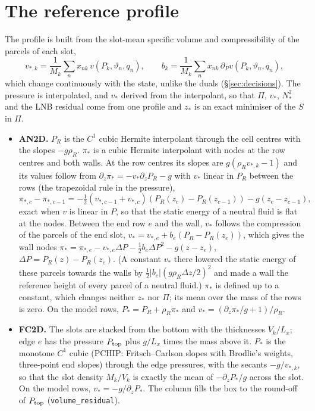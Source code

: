 \documentclass[11pt,a4paper]{article}
\newcommand{\vt}{\vartheta}
\newcommand{\code}[1]{\texttt{#1}}
\newcommand{\Ptop}{P_{\rm top}}
\newcommand{\zs}{z_{*}}
\begin{document}
\section{The reference profile}\label{sec:profile}
The profile is built from the slot-mean specific volume and compressibility of the parcels of each slot,
\begin{equation}
  v_{*,k}=\frac1{M_k}\sum_nx_{nk}\,v(P_k,\vt_n,q_n),\qquad b_k=\frac1{M_k}\sum_nx_{nk}\,\partial_Pv(P_k,\vt_n,q_n),
\end{equation}
which change continuously with the state, unlike the duals (\S\ref{sec:decisions}). The pressure is interpolated, and $v_*$
derived from the interpolant, so that $\Pi$, $v_*$, $N_*^2$ and the LNB residual come from one profile and $\zs$ is an exact
minimiser of the $S$ in $\Pi$.
\begin{itemize}
  \item \textbf{AN2D.} $P_R$ is the $C^1$ cubic Hermite interpolant through the cell centres with the slopes $-g\rho_R$. $\pi_*$
        is a cubic Hermite interpolant with nodes at the row centres and both walls. At the row centres its slopes are
        $g(\rho_Rv_{*,k}-1)$ and its values follow from $\partial_z\pi_*=-v_*\partial_zP_R-g$ with $v_*$ linear in $P_R$
        between the rows (the trapezoidal rule in the pressure),
        \begin{equation}
          \pi_{*,c}-\pi_{*,c-1}=-\tfrac12(v_{*,c-1}+v_{*,c})\left(P_R(z_c)-P_R(z_{c-1})\right)-g(z_c-z_{c-1}),
        \end{equation}
        exact when $v$ is linear in $P$, so that the static energy of a neutral fluid is flat at the nodes. Between the end
        row $e$ and the wall, $v_*$ follows the compression of the parcels of the end slot, $v_*=v_{*,e}+b_e(P_R-P_R(z_e))$,
        which gives the wall nodes
        $\pi_*=\pi_{*,e}-v_{*,e}\Delta P-\tfrac12b_e\Delta P^2-g(z-z_e)$, $\Delta P=P_R(z)-P_R(z_e)$. (A constant $v_*$ there
        lowered the static energy of these parcels towards the walls by $\tfrac12|b_e|(g\rho_R\Delta z/2)^2$ and made a wall
        the reference height of every parcel of a neutral fluid.) $\pi_*$ is defined up to a constant, which changes neither
        $\zs$ nor $\Pi$; its mean over the mass of the rows is zero. On the model rows, $P_*=P_R+\rho_R\pi_*$ and
        $v_*=(\partial_z\pi_*/g+1)/\rho_R$.
  \item \textbf{FC2D.} The slots are stacked from the bottom with the thicknesses $V_k/L_x$; edge $e$ has the pressure $\Ptop$
        plus $g/L_x$ times the mass above it. $P_*$ is the monotone $C^1$ cubic (PCHIP: Fritsch--Carlson slopes with
        Brodlie's weights, three-point end slopes) through the edge pressures, with the secants $-g/v_{*,k}$, so that the
        slot density $M_k/V_k$ is exactly the mean of $-\partial_zP_*/g$ across the slot. On the model rows,
        $v_*=-g/\partial_zP_*$. The column fills the box to the round-off of $\Ptop$ (\code{volume\_residual}).
\end{itemize}
\end{document}
